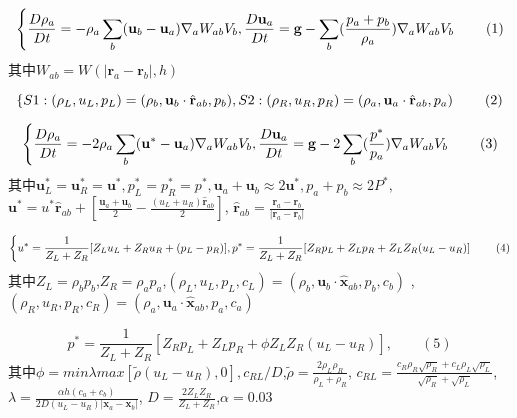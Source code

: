 \documentclass[UTF8]{ctexart}
\begin{document}
\begin{equation}
    \left\{ \frac{D \rho_a}{Dt}=-\rho_a\sum_{b}(\mathbf{u}_b - \mathbf{u}_a)\nabla_a W_{ab}V_b ,\\
    \frac{D \mathbf{u}_a}{Dt}=\mathbf{g}-\sum_{b}(\frac{p_a+p_b}{\rho_a})\nabla_a W_{ab} V_b \right. \qquad(1)
\end{equation}
其中$W_{ab}=W(|\mathbf{r}_a-\mathbf{r}_b|,h)$

\begin{equation}
    \left\{ S1:(\rho_L,u_L,p_L)=(\rho_b,\mathbf{u}_b\cdot\hat{\mathbf{r}}_{ab},p_b), \\
    S2:(\rho_R,u_R,p_R)=(\rho_a,\mathbf{u}_a\cdot\hat{\mathbf{r}}_{ab},p_a) \right. \qquad(2)
\end{equation}

\begin{equation}
    \left\{ \frac{D \rho_a}{Dt}=-2\rho_a \sum_{b}(\mathbf{u}^*-\mathbf{u}_a)\nabla_a W_{ab} V_b, \\
    \frac{D \mathbf{u}_a}{Dt}=\mathbf{g}-2\sum_{b}(\frac{p^*}{p_a})\nabla_a W_{ab} V_b \right. \qquad (3)
\end{equation}
其中$\mathbf{u}^*_L=\mathbf{u}^*_R=\mathbf{u}^*,p^*_L=p^*_R=p^*,\mathbf{u}_a+\mathbf{u}_b \approx 2\mathbf{u}^*,p_a+p_b\approx2P^*,$
$\mathbf{u}^*=u^*\hat{\mathbf{r}}_{ab}+[\frac{\mathbf{u}_a+\mathbf{u}_b}{2}-\frac{(u_L+u_R)\hat{\mathbf{r}}_{ab}}{2}]$,
$\hat{\mathbf{r}}_{ab}=\frac{\mathbf{r}_a-\mathbf{r}_b}{|\mathbf{r}_a-\mathbf{r}_b|}$

\begin{equation}
    \left\{ u^*=\frac{1}{Z_L+Z_R}[Z_L u_L + Z_R u_R +(p_L - p_R)], \\
    p^* = \frac{1}{Z_L + Z_R}[Z_R p_L + Z_L p_R + Z_L Z_R(u_L -u_R)] \right. \qquad (4)
\end{equation}
其中$Z_L=\rho_b p_b$,$Z_R=\rho_a p_a$,$(\rho_L ,u_L ,p_L ,c_L)=(\rho_b ,\mathbf{u}_b\cdot\hat{\mathbf{x}}_{ab},p_b,c_b)$
,$(\rho_R,u_R,p_R,c_R)=(\rho_a,\mathbf{u}_a\cdot\hat{\mathbf{x}}_{ab},p_a,c_a)$

\begin{equation}
    p^*=\frac{1}{Z_L+Z_R}[Z_R p_L+Z_L p_R + \phi Z_L Z_R(u_L - u_R)], \qquad (5)
\end{equation}
其中$\phi = min{\lambda max[\tilde{\rho}(u_L - u_R),0],c_{RL}/D}$,$\tilde{\rho}=\frac{2\rho_L\rho_R}{\rho_L+\rho_R}$,
$c_{RL}=\frac{c_R\rho_R \sqrt{\rho_R}+c_L\rho_L \sqrt{\rho_L}}{\sqrt{\rho_R}+\sqrt{\rho_L}}$,$\lambda=\frac{\alpha h (c_a+c_b)}{2D(u_L-u_R)|\mathbf{x}_a-\mathbf{x}_b|}$,
$D=\frac{2Z_L Z_R}{Z_L + Z_R}$,$\alpha=0.03$
\end{document}

